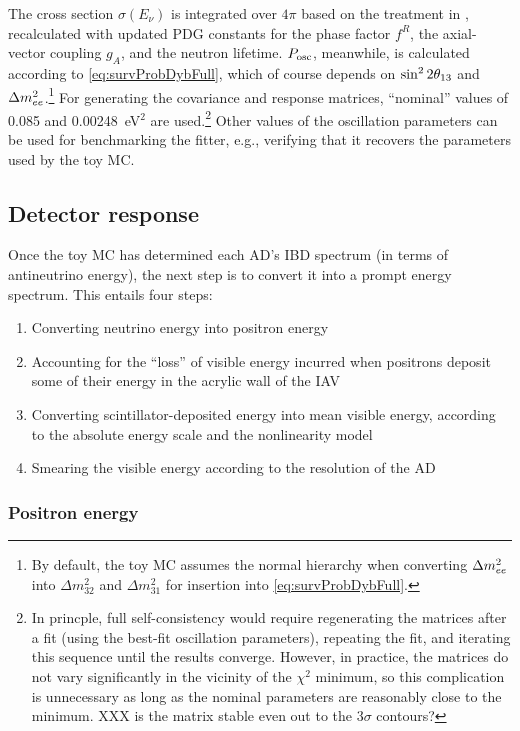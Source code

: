 \documentclass[../thesis.tex]{subfiles}
\begin{document}
The cross section $\sigma(E_\nu)$ is integrated over $4\pi$ based on the treatment in \cite{Vogel_1999}, recalculated with updated PDG constants for the phase factor $f^R$, the axial-vector coupling $g_A$, and the neutron lifetime. $P_\mathrm{osc}$, meanwhile, is calculated according to \autoref{eq:survProbDybFull}, which of course depends on $\sin^2 2\theta_{13}$ and $\Delta m^2_{ee}$.\footnote{By default, the toy MC assumes the normal hierarchy when converting $\Delta m^2_{ee}$ into $\Delta m^2_{32}$ and $\Delta m^2_{31}$ for insertion into \autoref{eq:survProbDybFull}.} For generating the covariance and response matrices, ``nominal'' values of 0.085 and 0.00248~eV$^2$ are used.\footnote{In princple, full self-consistency would require regenerating the matrices after a fit (using the best-fit oscillation parameters), repeating the fit, and iterating this sequence until the results converge. However, in practice, the matrices do not vary significantly in the vicinity of the $\chi^2$ minimum, so this complication is unnecessary as long as the nominal parameters are reasonably close to the minimum. XXX is the matrix stable even out to the 3$\sigma$ contours?} Other values of the oscillation parameters can be used for benchmarking the fitter, e.g., verifying that it recovers the parameters used by the toy MC.

\subsection{Detector response}
\label{sec:fitToyDetResponse}

Once the toy MC has determined each AD's IBD spectrum (in terms of antineutrino energy), the next step is to convert it into a prompt energy spectrum. This entails four steps:

\begin{enumerate}
\item Converting neutrino energy into positron energy
\item Accounting for the ``loss'' of visible energy incurred when positrons deposit some of their energy in the acrylic wall of the IAV
\item Converting scintillator-deposited energy into mean visible energy, according to the absolute energy scale and the nonlinearity model
\item Smearing the visible energy according to the resolution of the AD
\end{enumerate}

\subsubsection{Positron energy}
\end{document}
